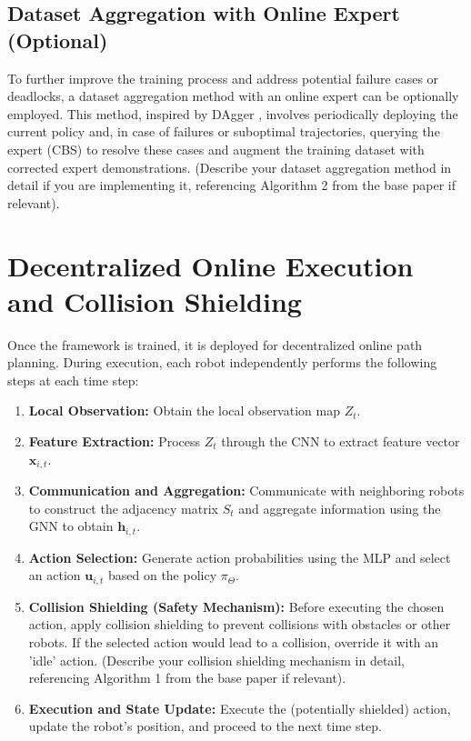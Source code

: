 \subsection{Dataset Aggregation with Online Expert (Optional)}

To further improve the training process and address potential failure cases or deadlocks, a dataset aggregation method with an online expert can be optionally employed. This method, inspired by DAgger \cite{Ross_et_al_2011}, involves periodically deploying the current policy and, in case of failures or suboptimal trajectories, querying the expert (CBS) to resolve these cases and augment the training dataset with corrected expert demonstrations. (Describe your dataset aggregation method in detail if you are implementing it, referencing Algorithm 2 from the base paper if relevant).

\section{Decentralized Online Execution and Collision Shielding}

Once the framework is trained, it is deployed for decentralized online path planning. During execution, each robot independently performs the following steps at each time step:

\begin{enumerate}
    \item \textbf{Local Observation:} Obtain the local observation map $Z_t$.
    \item \textbf{Feature Extraction:} Process $Z_t$ through the CNN to extract feature vector $\mathbf{x}_{i,t}$.
    \item \textbf{Communication and Aggregation:} Communicate with neighboring robots to construct the adjacency matrix $S_t$ and aggregate information using the GNN to obtain $\mathbf{h}_{i,t}$.
    \item \textbf{Action Selection:} Generate action probabilities using the MLP and select an action $\mathbf{u}_{i,t}$ based on the policy $\pi_{\Theta}$.
    \item \textbf{Collision Shielding (Safety Mechanism):} Before executing the chosen action, apply collision shielding to prevent collisions with obstacles or other robots. If the selected action would lead to a collision, override it with an 'idle' action. (Describe your collision shielding mechanism in detail, referencing Algorithm 1 from the base paper if relevant).
    \item \textbf{Execution and State Update:} Execute the (potentially shielded) action, update the robot's position, and proceed to the next time step.
\end{enumerate}

